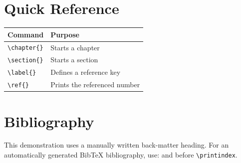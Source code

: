 \documentclass[12pt,a4paper,oneside]{book}
\begin{document}
\appendix
\chapter{Quick Reference}
\begin{tabularx}{\linewidth}{|l|X|}
\hline
Command & Purpose\\ \hline
\verb|\chapter{}| & Starts a chapter\\
\verb|\section{}| & Starts a section\\
\verb|\label{}| & Defines a reference key\\
\verb|\ref{}| & Prints the referenced number\\
\hline
\end{tabularx}

\backmatter
\chapter*{Bibliography}
This demonstration uses a manually written back-matter heading.
For an automatically generated BibTeX bibliography, use:
\verb|| and
\verb|| before \verb|\printindex|.

\printindex
\end{document}
